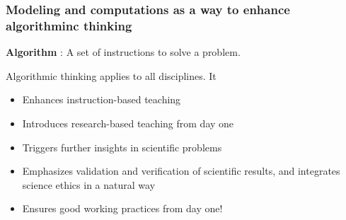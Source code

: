 \documentclass{beamer}
\begin{document}
\begin{frame}
\frametitle{Modeling and computations as a way to enhance algorithminc thinking}

\begin{block}{}
\textbf{Algorithm} :
A set of instructions to solve a problem.
\end{block}

\begin{block}{Algorithmic thinking applies to all disciplines. It }
\begin{itemize}
\item Enhances instruction-based teaching

\item Introduces research-based teaching  from day one

\item Triggers further insights in scientific problems

\item Emphasizes validation and verification of scientific results, and integrates science ethics in a natural way

\item Ensures good working practices from day one!
\end{itemize}

\noindent
\end{block}
\end{frame}
\end{document}
